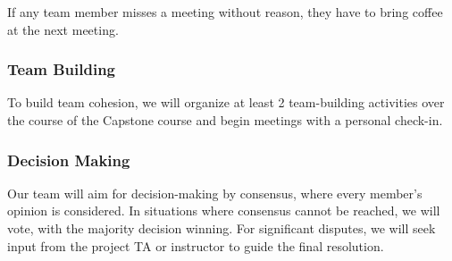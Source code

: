\documentclass{article}
\begin{document}
If any team member misses a meeting without reason, they have to bring coffee at the next meeting.

\subsubsection*{Team Building}

To build team cohesion, we will organize at least 2 team-building activities over the course of the Capstone course and begin meetings with a personal check-in.

\subsubsection*{Decision Making} 

Our team will aim for decision-making by consensus, where every member's opinion is considered. In situations where consensus cannot be reached, we will vote, with the majority decision winning. For significant disputes, we will seek input from the project TA or instructor to guide the final resolution.
\end{document}
